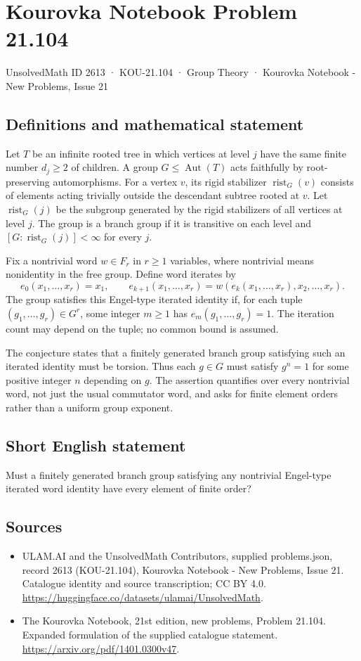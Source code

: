 \documentclass[11pt,a4paper]{article}
\begin{document}
\section*{Kourovka Notebook Problem 21.104}\label{2613}
{\small UnsolvedMath ID 2613 · KOU-21.104 · Group Theory · Kourovka Notebook - New Problems, Issue 21}
\subsection{Definitions and mathematical statement}
Let $T$ be an infinite rooted tree in which vertices at level $j$ have the same finite number $d_j\ge2$ of children. A group $G\le\operatorname{Aut}(T)$ acts faithfully by root-preserving automorphisms. For a vertex $v$, its rigid stabilizer $\operatorname{rist}_G(v)$ consists of elements acting trivially outside the descendant subtree rooted at $v$. Let $\operatorname{rist}_G(j)$ be the subgroup generated by the rigid stabilizers of all vertices at level $j$. The group is a branch group if it is transitive on each level and $[G:\operatorname{rist}_G(j)]<\infty$ for every $j$.

Fix a nontrivial word $w\in F_r$ in $r\ge1$ variables, where nontrivial means nonidentity in the free group. Define word iterates by
\[
 e_0(x_1,\ldots,x_r)=x_1,\qquad
 e_{k+1}(x_1,\ldots,x_r)
 =w(e_k(x_1,\ldots,x_r),x_2,\ldots,x_r).
\]
The group satisfies this Engel-type iterated identity if, for each tuple $(g_1,\ldots,g_r)\in G^r$, some integer $m\ge1$ has $e_m(g_1,\ldots,g_r)=1$. The iteration count may depend on the tuple; no common bound is assumed.

The conjecture states that a finitely generated branch group satisfying such an iterated identity must be torsion. Thus each $g\in G$ must satisfy $g^n=1$ for some positive integer $n$ depending on $g$. The assertion quantifies over every nontrivial word, not just the usual commutator word, and asks for finite element orders rather than a uniform group exponent.
\subsection{Short English statement}
Must a finitely generated branch group satisfying any nontrivial Engel-type iterated word identity have every element of finite order?
\subsection{Sources}
\begin{itemize}
\item[S1] ULAM.AI and the UnsolvedMath Contributors, supplied problems.json, record 2613 (KOU-21.104), Kourovka Notebook - New Problems, Issue 21. Catalogue identity and source transcription; CC BY 4.0.
\url{https://huggingface.co/datasets/ulamai/UnsolvedMath}.
\item[S2] The Kourovka Notebook, 21st edition, new problems, Problem 21.104. Expanded formulation of the supplied catalogue statement.
\url{https://arxiv.org/pdf/1401.0300v47}.
\end{itemize}
\end{document}
